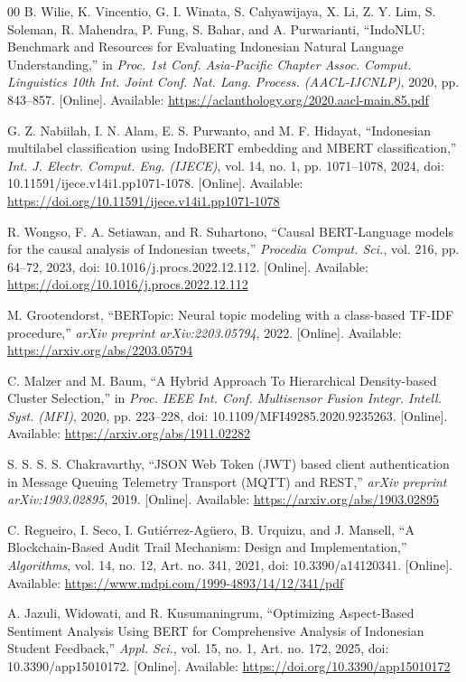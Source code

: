 \documentclass[conference]{IEEEtran}
\begin{document}
\begin{thebibliography}{00}
B. Wilie, K. Vincentio, G. I. Winata, S. Cahyawijaya, X. Li, Z. Y. Lim, S. Soleman, R. Mahendra, P. Fung, S. Bahar, and A. Purwarianti, ``IndoNLU: Benchmark and Resources for Evaluating Indonesian Natural Language Understanding,'' in \textit{Proc. 1st Conf. Asia-Pacific Chapter Assoc. Comput. Linguistics 10th Int. Joint Conf. Nat. Lang. Process. (AACL-IJCNLP)}, 2020, pp. 843--857. [Online]. Available: \url{https://aclanthology.org/2020.aacl-main.85.pdf}

G. Z. Nabiilah, I. N. Alam, E. S. Purwanto, and M. F. Hidayat, ``Indonesian multilabel classification using IndoBERT embedding and MBERT classification,'' \textit{Int. J. Electr. Comput. Eng. (IJECE)}, vol. 14, no. 1, pp. 1071--1078, 2024, doi: 10.11591/ijece.v14i1.pp1071-1078. [Online]. Available: \url{https://doi.org/10.11591/ijece.v14i1.pp1071-1078}

R. Wongso, F. A. Setiawan, and R. Suhartono, ``Causal BERT-Language models for the causal analysis of Indonesian tweets,'' \textit{Procedia Comput. Sci.}, vol. 216, pp. 64--72, 2023, doi: 10.1016/j.procs.2022.12.112. [Online]. Available: \url{https://doi.org/10.1016/j.procs.2022.12.112}

M. Grootendorst, ``BERTopic: Neural topic modeling with a class-based TF-IDF procedure,'' \textit{arXiv preprint arXiv:2203.05794}, 2022. [Online]. Available: \url{https://arxiv.org/abs/2203.05794}

C. Malzer and M. Baum, ``A Hybrid Approach To Hierarchical Density-based Cluster Selection,'' in \textit{Proc. IEEE Int. Conf. Multisensor Fusion Integr. Intell. Syst. (MFI)}, 2020, pp. 223--228, doi: 10.1109/MFI49285.2020.9235263. [Online]. Available: \url{https://arxiv.org/abs/1911.02282}

S. S. S. S. Chakravarthy, ``JSON Web Token (JWT) based client authentication in Message Queuing Telemetry Transport (MQTT) and REST,'' \textit{arXiv preprint arXiv:1903.02895}, 2019. [Online]. Available: \url{https://arxiv.org/abs/1903.02895}

C. Regueiro, I. Seco, I. Guti{\'e}rrez-Ag{\"u}ero, B. Urquizu, and J. Mansell, ``A Blockchain-Based Audit Trail Mechanism: Design and Implementation,'' \textit{Algorithms}, vol. 14, no. 12, Art. no. 341, 2021, doi: 10.3390/a14120341. [Online]. Available: \url{https://www.mdpi.com/1999-4893/14/12/341/pdf}

A. Jazuli, Widowati, and R. Kusumaningrum, ``Optimizing Aspect-Based Sentiment Analysis Using BERT for Comprehensive Analysis of Indonesian Student Feedback,'' \textit{Appl. Sci.}, vol. 15, no. 1, Art. no. 172, 2025, doi: 10.3390/app15010172. [Online]. Available: \url{https://doi.org/10.3390/app15010172}


\end{thebibliography}
\end{document}
